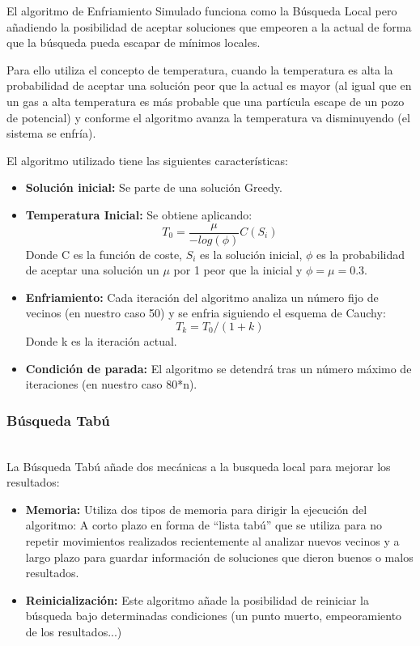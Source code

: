 \documentclass[runningheads,a4paper]{llncs}
\begin{document}
El algoritmo de Enfriamiento Simulado funciona como la Búsqueda Local pero añadiendo la posibilidad de aceptar soluciones que empeoren a la actual de forma que la búsqueda pueda escapar de mínimos locales.

Para ello utiliza el concepto de temperatura, cuando la temperatura es alta la probabilidad de aceptar una solución peor que la actual es mayor (al igual que en un gas a alta temperatura es más probable que una partícula escape de un pozo de potencial) y conforme el algoritmo avanza la temperatura va disminuyendo (el sistema se enfría).

El algoritmo utilizado tiene las siguientes características:

\begin{itemize}
\item \textbf{Solución inicial: } Se parte de una solución Greedy.
\item \textbf{Temperatura Inicial:} Se obtiene aplicando:  
\begin{equation}
T_0 = \frac{\mu}{-log(\phi)} C(S_i) 
\end{equation}
Donde C es la función de coste, $S_i$ es la solución inicial, $\phi$ es la probabilidad de aceptar una solución un $\mu$ por 1 peor que la inicial y $\phi = \mu = 0.3$.

\item \textbf{Enfriamiento: } Cada iteración del algoritmo analiza un número fijo de vecinos (en nuestro caso 50) y se enfria siguiendo el esquema de Cauchy:
\begin{equation}
T_k = T_0 / (1 + k)
\end{equation}
Donde k es la iteración actual.
\item \textbf{Condición de parada: } El algoritmo se detendrá tras un número máximo de iteraciones (en nuestro caso 80*n).
\end{itemize}

\subsubsection{Búsqueda Tabú}
~\\
La Búsqueda Tabú añade dos mecánicas a la busqueda local para mejorar los resultados:

\begin{itemize}
\item \textbf{Memoria: } Utiliza dos tipos de memoria para dirigir la ejecución del algoritmo: A corto plazo en forma de ``lista tabú'' que se utiliza para no repetir movimientos realizados recientemente al analizar nuevos vecinos y a largo plazo para guardar información de soluciones que dieron buenos o malos resultados.
\item \textbf{Reinicialización: } Este algoritmo añade la posibilidad de reiniciar la búsqueda bajo determinadas condiciones (un punto muerto, empeoramiento de los resultados...) 
\end{itemize}
\end{document}
